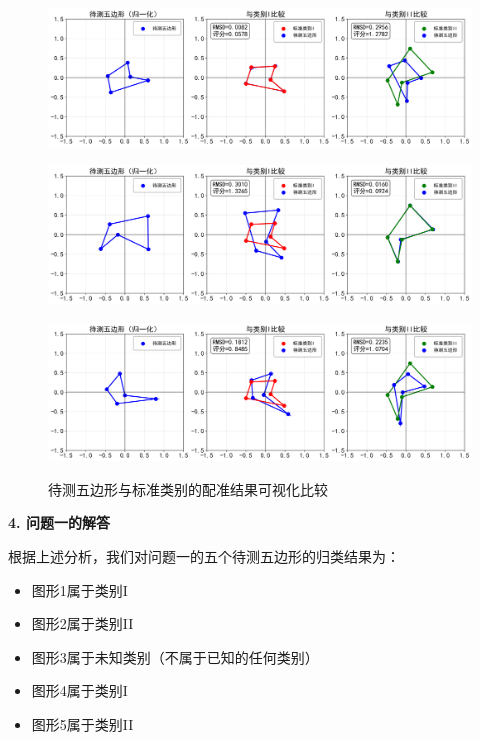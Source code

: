 \begin{figure}[H]
\centering

{\includegraphics[width=1\textwidth]{figures/test_samples/pentagon_1.png}}

{\includegraphics[width=1\textwidth]{figures/test_samples/pentagon_2.png}}

{\includegraphics[width=1\textwidth]{figures/test_samples/pentagon_3.png}}

\caption{待测五边形与标准类别的配准结果可视化比较}
\label{fig:peizhun}
\end{figure}

\textbf{4. 问题一的解答}
    
根据上述分析，我们对问题一的五个待测五边形的归类结果为：
    \begin{itemize}
        \item 图形1属于类别I
        \item 图形2属于类别II
        \item 图形3属于未知类别（不属于已知的任何类别）
        \item 图形4属于类别I
        \item 图形5属于类别II
    \end{itemize}

